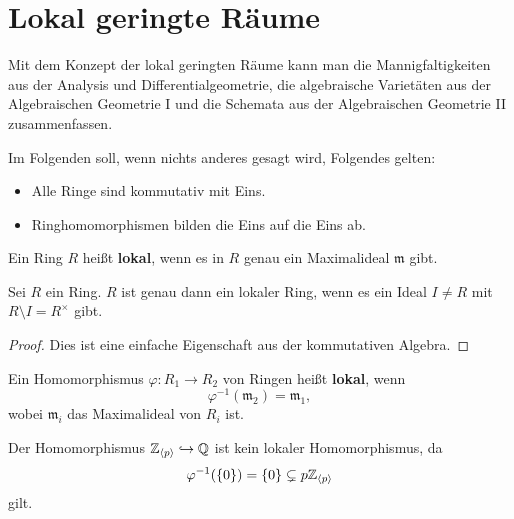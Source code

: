 
\chapter{Lokal geringte Räume}

Mit dem Konzept der lokal geringten Räume kann man die Mannigfaltigkeiten aus der Analysis und Differentialgeometrie, die algebraische Varietäten aus der Algebraischen Geometrie I und die Schemata aus der Algebraischen Geometrie II zusammenfassen.

\begin{bem}
	Im Folgenden soll, wenn nichts anderes gesagt wird, Folgendes gelten:
	\begin{itemize}
	 	\item Alle Ringe sind kommutativ mit Eins.
	 	\item Ringhomomorphismen bilden die Eins auf die Eins ab.
	 \end{itemize}
\end{bem}

\begin{bem*}
	Ein Ring $R$ heißt \textbf{lokal}, wenn es in $R$ genau ein Maximalideal $\mathfrak{m}$ gibt.
\end{bem*}

\begin{prop}
\label{prop:2.2}
	Sei $R$ ein Ring. $R$ ist genau dann ein lokaler Ring, wenn es ein Ideal $I \neq R$ mit $R\setminus I = R^\times$ gibt.
	\begin{proof}
		Dies ist eine einfache Eigenschaft aus der kommutativen Algebra.
	\end{proof}
\end{prop}

\begin{defn}
	Ein Homomorphismus $\varphi\colon R_1 \to R_2$ von Ringen heißt \textbf{lokal}, wenn
	\[
		\varphi^{-1}(\mathfrak{m}_2) = \mathfrak{m}_1,
	\]
	wobei $\mathfrak{m}_i$ das Maximalideal von $R_i$ ist.
\end{defn}

\begin{bsp*}
	Der Homomorphismus $\mathbb {Z}_{\langle p \rangle} \hookrightarrow \mathbb {Q}$ ist kein lokaler Homomorphismus, da
	\[
		\varphi^{-1}(\{0\}) = \{0\} \subsetneq p\mathbb {Z}_{\langle p \rangle}
	\]
	gilt.
\end{bsp*}

